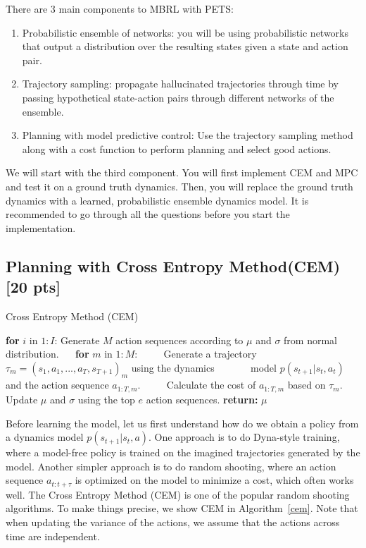 \documentclass[12pt]{article}
\begin{document}
There are 3 main components to MBRL with PETS: 
\begin{enumerate}
    \item Probabilistic ensemble of networks: you will be using probabilistic networks that output a distribution over the resulting states given a state and action pair.  
    \item Trajectory sampling: propagate hallucinated trajectories through time by passing hypothetical state-action pairs through different networks of the ensemble.  
    \item Planning with model predictive control: Use the trajectory sampling method along with a cost function to perform planning and select good actions.
\end{enumerate}
We will start with the third component. You will first implement CEM and MPC and test it on a ground truth dynamics. Then, you will replace the ground truth dynamics with a learned, probabilistic ensemble dynamics model. It is recommended to go through all the questions before you start the implementation.

\subsection{Planning with Cross Entropy Method(CEM) [20 pts]}
\begin{algorithm}
\label{algocem}
\caption{Cross Entropy Method (CEM)\label{cem}}
\begin{algorithmic}[1]
\State \textbf{for} $i$ in $1:I$:
\State Generate $M$ action sequences according to $\mu$ and $\sigma$ from normal distribution.
\State $\quad$ \textbf{for} $m$ in $1:M$:
\State $\quad\quad$ Generate a trajectory $\tau_m = (s_1, a_1, ..., a_{T}, s_{T+1})_m$ using the dynamics
\State $\quad\quad\quad$  model $p(s_{t+1} | s_t, a_t)$ and the action sequence $a_{1:T, m}$.
\State $\quad\quad$ Calculate the cost of $a_{1:T, m}$ based on $\tau_m$.
\State $\quad$ Update $\mu$ and $\sigma$ using the top $e$ action sequences.  
\State \textbf{return:} $\mu$
\EndProcedure
\end{algorithmic}
\end{algorithm}
Before learning the model, let us first understand how do we obtain a policy from a dynamics model $p(s_{t+1} | s_t, a)$. One approach is to do Dyna-style training, where a model-free policy is trained on the imagined trajectories generated by the model. Another simpler approach is to do random shooting, where an action sequence $a_{t:t+\tau}$ is optimized on the model to minimize a cost, which often works well. The Cross Entropy Method (CEM) is one of the popular random shooting algorithms. To make things precise, we show CEM in Algorithm~\ref{cem}. Note that when updating the variance of the actions, we assume that the actions across time are independent.
\end{document}

